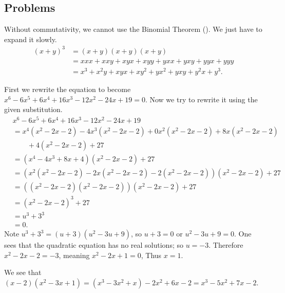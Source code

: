 \subsection*{Problems}
\begin{questions}
    \item Without commutativity, we cannot use the Binomial Theorem (). We just have to expand it slowly.
    \begin{align*}
        (x+y)^3 &= (x+y)(x+y)(x+y)\\
        &= xxx + xxy + xyx + xyy + yxx + yxy + yyx + yyy\\
        &= x^3 + x^2y + xyx + xy^2 + yx^2 + yxy + y^2x + y^3.
    \end{align*}

    \item First we rewrite the equation to become $x^6 - 6x^5 + 6x^4 + 16x^3 - 12x^2 - 24x + 19 = 0$. Now we try to rewrite it using the given substitution.
    \begin{align*}
        &x^6 - 6x^5 + 6x^4 + 16x^3 - 12x^2 - 24x + 19\\
        &=x^4(x^2-2x-2) - 4x^3(x^2-2x-2) + 0x^2(x^2-2x-2) + 8x(x^2-2x-2)\\
        &\quad\quad+ 4(x^2-2x-2) + 27\\
        &= (x^4-4x^3+8x+4)(x^2-2x-2) + 27\\
        &= (x^2(x^2-2x-2) - 2x(x^2-2x-2) - 2(x^2-2x-2))(x^2-2x-2) + 27\\
        &= ((x^2-2x-2)(x^2-2x-2))(x^2-2x-2)+27\\
        &= (x^2-2x-2)^3 + 27\\
        &= u^3 + 3^3\\
        &= 0.
    \end{align*}
    Note $u^3 + 3^3 = (u+3)(u^2 - 3u + 9)$, so $u+3 = 0$ or $u^2 - 3u + 9 = 0$. One sees that the quadratic equation has no real solutions; so $u = -3$. Therefore $x^2 - 2x - 2 = -3$, meaning $x^2-2x+1 = 0$, Thus $x = 1$.

    \item \begin{partquestions}{\roman*}
        \item We see that $(x-2)(x^2-3x+1) = (x^3 - 3x^2 + x) - 2x^2 + 6x - 2 = x^3 - 5x^2 + 7x - 2$.


\end{partquestions}
\end{questions}

